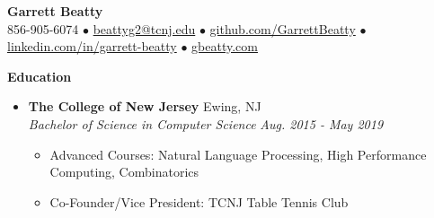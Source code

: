 \documentclass[letterpaper,10pt]{article}
\newcommand{\resitem}[1]{\item #1 \vspace{-2pt}}
\newcommand{\resheading}[1]{{\large \colorbox{mygrey}{\begin{minipage}{\textwidth}{\textbf{#1 \vphantom{p\^{E}}}}\end{minipage}}}}
\newcommand{\ressubheading}[4]{%
  \item\textbf{#1} \hfill #2\null\\
  \textit{#3} \hfill \textit{#4}%
  \vspace{-5pt}
}%
\begin{document}
\begin{center}
\textbf{\Huge Garrett Beatty} \\
\vspace{0.05in}
856-905-6074 $\bullet$ \href{mailto:beattyg2@tcnj.edu}{beattyg2@tcnj.edu} $\bullet$ \href{http://github.com/GarrettBeatty}{github.com/GarrettBeatty} $\bullet$ \href{http://linkedin.com/in/garrett-beatty}{linkedin.com/in/garrett-beatty} $\bullet$ \href{https://gbeatty.com}{gbeatty.com}
\end{center}

\vspace{-0.05in}

\resheading{Education}
\begin{itemize}

\ressubheading{The College of New Jersey}{Ewing, NJ}{Bachelor of Science in Computer Science}{Aug. 2015 - May 2019}
	\begin{itemize}
		\resitem{Advanced Courses: Natural Language Processing, High Performance Computing, Combinatorics}
		\resitem{Co-Founder/Vice President: TCNJ Table Tennis Club}
	\end{itemize}
\end{itemize}
\end{document}

